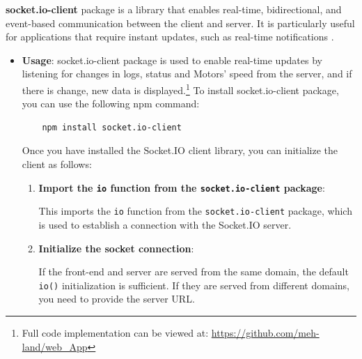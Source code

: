 \textbf{socket.io-client} package is a library that enables real-time, bidirectional, and event-based communication between the client and server. It is particularly useful for applications that require instant updates, such as real-time notifications \cite{socketio-client} \cite{socketio-react}.
\vspace{-2mm}
\begin{itemize}
    \item \textbf{Usage}: socket.io-client package is used to enable real-time updates by listening for changes in logs, status and Motors' speed from the server, and if there is change, new data is displayed.\footnote{Full code implementation can be viewed at: \url{https://github.com/meh-land/web\_App}}
    To install socket.io-client package, you can use the following npm command:
        \begin{verbatim}
    npm install socket.io-client
    \end{verbatim}
    Once you have installed the Socket.IO client library, you can initialize the client as follows:

    \vspace{-2mm}
\begin{enumerate}
    \item \textbf{Import the \texttt{io} function from the \texttt{socket.io-client} package}:

    \vspace{-3mm}
    This imports the \texttt{io} function from the \texttt{socket.io-client} package, which is used to establish a connection with the Socket.IO server.

    \item \textbf{Initialize the socket connection}:

    \vspace{-3mm}
    If the front-end and server are served from the same domain, the default \texttt{io()} initialization is sufficient. If they are served from different domains, you need to provide the server URL.


\end{enumerate}
\end{itemize}
